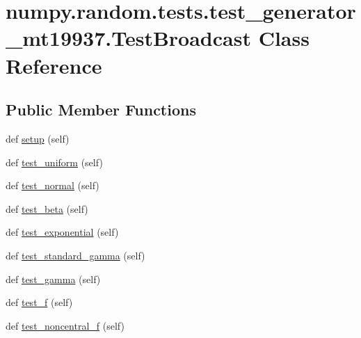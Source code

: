 \hypertarget{classnumpy_1_1random_1_1tests_1_1test__generator__mt19937_1_1TestBroadcast}{}\section{numpy.\+random.\+tests.\+test\+\_\+generator\+\_\+mt19937.\+Test\+Broadcast Class Reference}
\label{classnumpy_1_1random_1_1tests_1_1test__generator__mt19937_1_1TestBroadcast}
\subsection*{Public Member Functions}
\begin{DoxyCompactItemize}
\item 
def \hyperlink{classnumpy_1_1random_1_1tests_1_1test__generator__mt19937_1_1TestBroadcast_a0e8262c50fea178b120628786cd4c7cd}{setup} (self)
\item 
def \hyperlink{classnumpy_1_1random_1_1tests_1_1test__generator__mt19937_1_1TestBroadcast_aec7d8e3c44d8ff30a9c2beac1fe89635}{test\+\_\+uniform} (self)
\item 
def \hyperlink{classnumpy_1_1random_1_1tests_1_1test__generator__mt19937_1_1TestBroadcast_a01673db63daea46f994a608fddb5f5f6}{test\+\_\+normal} (self)
\item 
def \hyperlink{classnumpy_1_1random_1_1tests_1_1test__generator__mt19937_1_1TestBroadcast_a581197e2c918872f90ea34a76881a471}{test\+\_\+beta} (self)
\item 
def \hyperlink{classnumpy_1_1random_1_1tests_1_1test__generator__mt19937_1_1TestBroadcast_a2721b855fce35a116dc3e7efaba2b47f}{test\+\_\+exponential} (self)
\item 
def \hyperlink{classnumpy_1_1random_1_1tests_1_1test__generator__mt19937_1_1TestBroadcast_aa23448fb8eee85130ebcc0c96fa2d077}{test\+\_\+standard\+\_\+gamma} (self)
\item 
def \hyperlink{classnumpy_1_1random_1_1tests_1_1test__generator__mt19937_1_1TestBroadcast_a3308fb71c74ffd8f1704c9d78d73a701}{test\+\_\+gamma} (self)
\item 
def \hyperlink{classnumpy_1_1random_1_1tests_1_1test__generator__mt19937_1_1TestBroadcast_a475f9ab524aab6564f92c6dd0a97a8a2}{test\+\_\+f} (self)
\item 
def \hyperlink{classnumpy_1_1random_1_1tests_1_1test__generator__mt19937_1_1TestBroadcast_a3efff3ad09a79ff612846fb70ab1e2ff}{test\+\_\+noncentral\+\_\+f} (self)

\end{DoxyCompactItemize}

